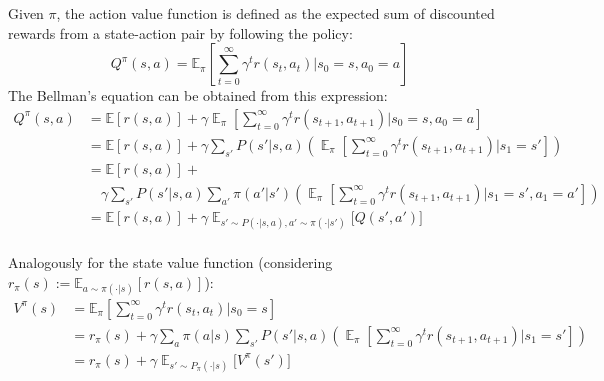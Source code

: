 \documentclass[12pt,a4paper,openright,twoside]{article}
\DeclareMathOperator*{\E}{\mathbb{E}}
\numberwithin{equation}{section}
\theoremstyle{definition}
\theoremstyle{remark}
\theoremstyle{plain}
\begin{document}
Given $\pi$, the action value function is defined as the expected sum of discounted rewards from a state-action pair by following the policy:
\begin{equation} \label{AV}
Q^\pi (s,a) = \mathbb{E}_\pi \left[ \sum_{t=0}^\infty \gamma^t r(s_t,a_t) \bigg| s_0=s, a_0=a \right] 
\end{equation}
The Bellman's equation can be obtained from this expression:
\begin{equation} \label{BE}
\begin{split}
    Q^\pi (s,a) &= \mathbb{E} \left[ r(s,a) \right] + \gamma \E_\pi \left[ \sum_{t=0}^\infty \gamma^t r(s_{t+1},a_{t+1}) \bigg| s_0=s, a_0=a \right] \\
    &= \mathbb{E} \left[ r(s,a) \right] + \gamma \sum_{s'} P(s'|s,a) \left( \E_\pi \left[ \sum_{t=0}^\infty \gamma^t r(s_{t+1},a_{t+1}) \bigg| s_1=s' \right] \right) \\
    &= \mathbb{E} \left[ r(s,a) \right] + \\
    & \quad \gamma \sum_{s'} P(s'|s,a) \sum_{a'} \pi(a'|s')\left( \E_\pi \left[ \sum_{t=0}^\infty \gamma^t r(s_{t+1},a_{t+1}) \bigg| s_1=s', a_1=a' \right] \right)\\
    &= \mathbb{E} \left[ r(s,a) \right] + \gamma \E_{s'\sim P(\cdot | s,a), a' \sim \pi(\cdot | s')} \bigg[Q(s',a') \bigg] \\
\end{split}
\end{equation}

Analogously for the state value function (considering $r_\pi(s) := \mathbb{E}_{a\sim\pi(\cdot | s)} \left[ r(s,a) \right]$):
\begin{equation} \label{SV}
\begin{split}
    V^\pi (s) &= \mathbb{E}_\pi \left[ \sum_{t=0}^\infty \gamma^t r(s_t,a_t) \bigg| s_0=s\right] \\
    &= r_\pi(s) + \gamma \sum_a \pi(a | s) \sum_{s'} P(s'|s,a) \left( \E_\pi \left[ \sum_{t=0}^\infty \gamma^t r(s_{t+1},a_{t+1}) \bigg| s_1=s' \right] \right) \\
    &= r_\pi(s) + \gamma \E_{s'\sim P_{\pi}(\cdot | s)} \bigg[V^\pi(s') \bigg]
\end{split}
\end{equation}
\end{document}

